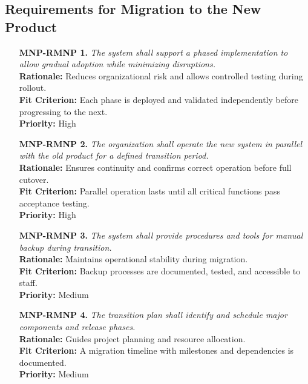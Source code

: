 \documentclass[12pt]{article}
\begin{document}
\subsection{Requirements for Migration to the New Product}
\begin{itemize}
  \item[\textbf{MNP-RMNP 1.}] \textit{The system shall support a
      phased implementation to allow gradual adoption while minimizing
    disruptions.}\\
    \textbf{Rationale:} Reduces organizational risk and allows
    controlled testing during rollout.\\
    \textbf{Fit Criterion:} Each phase is deployed and validated
    independently before progressing to the next.\\
    \textbf{Priority:} High

  \item[\textbf{MNP-RMNP 2.}] \textit{The organization shall operate
      the new system in parallel with the old product for a defined
    transition period.}\\
    \textbf{Rationale:} Ensures continuity and confirms correct
    operation before full cutover.\\
    \textbf{Fit Criterion:} Parallel operation lasts until all
    critical functions pass acceptance testing.\\
    \textbf{Priority:} High

  \item[\textbf{MNP-RMNP 3.}] \textit{The system shall provide
    procedures and tools for manual backup during transition.}\\
    \textbf{Rationale:} Maintains operational stability during migration.\\
    \textbf{Fit Criterion:} Backup processes are documented, tested,
    and accessible to staff.\\
    \textbf{Priority:} Medium

  \item[\textbf{MNP-RMNP 4.}] \textit{The transition plan shall
    identify and schedule major components and release phases.}\\
    \textbf{Rationale:} Guides project planning and resource allocation.\\
    \textbf{Fit Criterion:} A migration timeline with milestones and
    dependencies is documented.\\
    \textbf{Priority:} Medium
\end{itemize}
\end{document}
